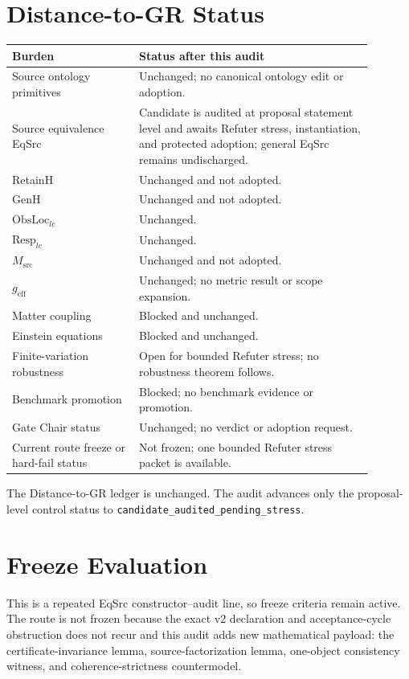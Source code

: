 \documentclass[11pt]{article}
\begin{document}
\section{Distance-to-GR Status}

\begin{longtable}{p{0.31\linewidth}p{0.58\linewidth}}
\toprule
Burden & Status after this audit \\
\midrule
Source ontology primitives & Unchanged; no canonical ontology edit or adoption. \\
Source equivalence EqSrc & Candidate is audited at proposal statement level and awaits Refuter stress, instantiation, and protected adoption; general EqSrc remains undischarged. \\
RetainH & Unchanged and not adopted. \\
GenH & Unchanged and not adopted. \\
\(\mathrm{ObsLoc}_{lc}\) & Unchanged. \\
\(\mathrm{Resp}_{lc}\) & Unchanged. \\
\(M_{\mathrm{src}}\) & Unchanged and not adopted. \\
\(g_{\mathrm{eff}}\) & Unchanged; no metric result or scope expansion. \\
Matter coupling & Blocked and unchanged. \\
Einstein equations & Blocked and unchanged. \\
Finite-variation robustness & Open for bounded Refuter stress; no robustness theorem follows. \\
Benchmark promotion & Blocked; no benchmark evidence or promotion. \\
Gate Chair status & Unchanged; no verdict or adoption request. \\
Current route freeze or hard-fail status & Not frozen; one bounded Refuter stress packet is available. \\
\bottomrule
\end{longtable}

The Distance-to-GR ledger is unchanged. The audit advances only the
proposal-level control status to \texttt{candidate\_audited\_pending\_stress}.

\section{Freeze Evaluation}

This is a repeated EqSrc constructor--audit line, so freeze criteria remain
active. The route is not frozen because the exact v2 declaration and
acceptance-cycle obstruction does not recur and this audit adds new
mathematical payload: the certificate-invariance lemma, source-factorization
lemma, one-object consistency witness, and coherence-strictness countermodel.
\end{document}
